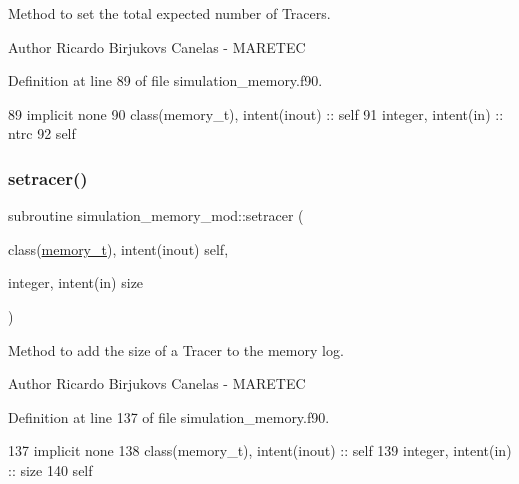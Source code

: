 Method to set the total expected number of Tracers. 

\begin{DoxyAuthor}{Author}
Ricardo Birjukovs Canelas -\/ M\+A\+R\+E\+T\+EC 
\end{DoxyAuthor}


Definition at line 89 of file simulation\+\_\+memory.\+f90.


\begin{DoxyCode}
89     \textcolor{keywordtype}{implicit none}
90     \textcolor{keywordtype}{class}(memory\_t), \textcolor{keywordtype}{intent(inout)} :: self
91     \textcolor{keywordtype}{integer}, \textcolor{keywordtype}{intent(in)} :: ntrc
92     self%
\end{DoxyCode}
\mbox{\label{namespacesimulation__memory__mod_a3dfcc0936ad144d609a1b9f9a3a0df6f}} 
\subsubsection{\texorpdfstring{setracer()}{setracer()}}
{\footnotesize\ttfamily subroutine simulation\+\_\+memory\+\_\+mod\+::setracer (\begin{DoxyParamCaption}\item[{class(\mbox{\hyperlink{structsimulation__memory__mod_1_1memory__t}{memory\+\_\+t}}), intent(inout)}]{self,  }\item[{integer, intent(in)}]{size }\end{DoxyParamCaption})\hspace{0.3cm}{\ttfamily [private]}}



Method to add the size of a Tracer to the memory log. 

\begin{DoxyAuthor}{Author}
Ricardo Birjukovs Canelas -\/ M\+A\+R\+E\+T\+EC 
\end{DoxyAuthor}


Definition at line 137 of file simulation\+\_\+memory.\+f90.


\begin{DoxyCode}
137     \textcolor{keywordtype}{implicit none}
138     \textcolor{keywordtype}{class}(memory\_t), \textcolor{keywordtype}{intent(inout)} :: self
139     \textcolor{keywordtype}{integer}, \textcolor{keywordtype}{intent(in)} :: size
140     self%
\end{DoxyCode}
\mbox{\label{namespacesimulation__memory__mod_acc218928b4d5fc707cbe3bc4befafa65}} 
